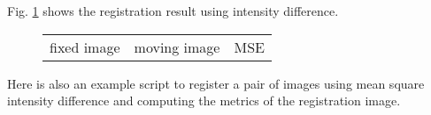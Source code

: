 Fig. \ref{fig:metric_example} shows the registration result using intensity difference.
\begin{figure}
    \label{fig:metric_example}
    \centering
    \begin{tabular}[h]{c|c|c}
        fixed image &
        moving image & 
        MSE  \\
    \end{tabular} 
\end{figure}
Here is also an example script to register a pair of images using mean
square intensity difference and computing the metrics of the
registration image.
